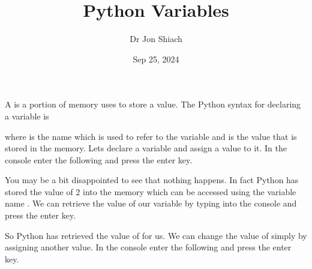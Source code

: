 \documentclass[letterpaper,10pt,english]{jupyterBook}
\title{Python Variables}
\date{Sep 25, 2024}
\author{Dr Jon Shiach}
\begin{document}
\pagestyle{empty}
\sphinxmaketitle
\pagestyle{plain}
\sphinxtableofcontents
\pagestyle{normal}
\label{\detokenize{_pages/1.2_Python_variables::doc}}


\sphinxAtStartPar
A  is a portion of memory uses to store a value. The Python syntax for declaring a variable is

\begin{sphinxVerbatim}[commandchars=\\\{\}]
  
\end{sphinxVerbatim}

\sphinxAtStartPar
where  is the name which is used to refer to the variable and  is the value that is stored in the memory. Lets declare a variable and assign a value to it. In the console enter the following and press the enter key.

\begin{sphinxVerbatim}[commandchars=\\\{\}]
 \PYG{p}{[}\PYG{p}{]}   
\end{sphinxVerbatim}

\sphinxAtStartPar
You may be a bit disappointed to see that nothing happens. In fact Python has stored the value of 2 into the memory which can be accessed using the variable name . We can retrieve the value of our variable by typing  into the console and press the enter key.

\begin{sphinxVerbatim}[commandchars=\\\{\}]
 \PYG{p}{[}\PYG{p}{]} 
\PYG{p}{[}\PYG{p}{]} 
\end{sphinxVerbatim}

\sphinxAtStartPar
So Python has retrieved the value of  for us. We can change the value of  simply by assigning another value. In the console enter the following and press the enter key.

\begin{sphinxVerbatim}[commandchars=\\\{\}]
 \PYG{p}{[}\PYG{p}{]}   
\end{sphinxVerbatim}
\end{document}
